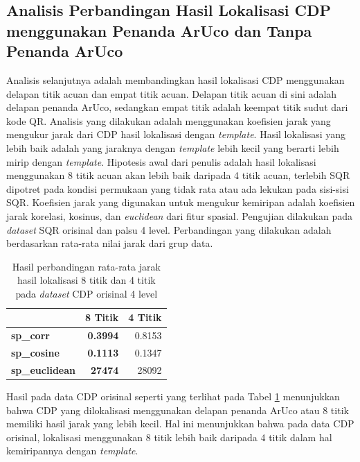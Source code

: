 \subsection{Analisis Perbandingan Hasil Lokalisasi CDP menggunakan Penanda ArUco dan Tanpa Penanda ArUco}
Analisis selanjutnya adalah membandingkan hasil lokalisasi CDP menggunakan delapan titik acuan dan empat titik acuan. Delapan titik acuan di sini adalah
delapan penanda ArUco, sedangkan empat titik adalah keempat titik sudut dari kode QR. Analisis yang dilakukan adalah menggunakan koefisien jarak yang mengukur
jarak dari CDP hasil lokalisasi dengan \emph{template}. Hasil lokalisasi yang lebih baik adalah yang jaraknya dengan \emph{template} lebih kecil yang berarti
lebih mirip dengan \emph{template}. Hipotesis awal dari penulis adalah hasil lokalisasi menggunakan 8 titik acuan akan lebih baik daripada 4 titik acuan,
terlebih SQR dipotret pada kondisi permukaan yang tidak rata atau ada lekukan pada sisi-sisi SQR. Koefisien jarak yang digunakan untuk mengukur
kemiripan adalah koefisien jarak korelasi, kosinus, dan \emph{euclidean} dari fitur spasial. Pengujian dilakukan pada \emph{dataset} SQR orisinal dan palsu 4
level. Perbandingan yang dilakukan adalah berdasarkan rata-rata nilai jarak dari grup data.

\begin{table}[!ht]
	\centering
	\caption{Hasil perbandingan rata-rata jarak hasil lokalisasi 8 titik dan 4 titik pada \emph{dataset} CDP orisinal 4 level}
	\vspace{0.5em}
	\begin{tabular}{|l|r|r|}
		\hline
		                       & \multicolumn{1}{c|}{\textbf{8 Titik}} & \multicolumn{1}{c|}{\textbf{4 Titik}} \\ \hline
		\textbf{sp\_corr}      & \textbf{0.3994}                       & 0.8153                                \\ \hline
		\textbf{sp\_cosine}    & \textbf{0.1113}                       & 0.1347                                \\ \hline
		\textbf{sp\_euclidean} & \textbf{27474}                        & 28092                                 \\ \hline
	\end{tabular}
	\label{Tab: 4-jaraklokalisasiarucovsnonarucoori}
\end{table}

Hasil pada data CDP orisinal seperti yang terlihat pada Tabel \ref{Tab: 4-jaraklokalisasiarucovsnonarucoori} menunjukkan bahwa CDP yang dilokalisasi
menggunakan delapan penanda ArUco atau 8 titik memiliki hasil jarak yang lebih kecil. Hal ini menunjukkan bahwa pada data CDP orisinal, lokalisasi menggunakan
8 titik lebih baik daripada 4 titik dalam hal kemiripannya dengan \emph{template}.

